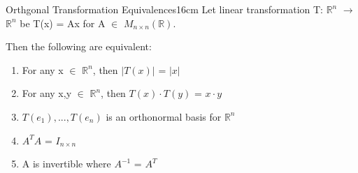     \vspace{0.5cm}

    

    \begin{wtheorem}{Orthgonal Transformation Equivalences}{16cm}
        Let linear transformation T: $\mathbb{R}^n$ $\rightarrow$ $\mathbb{R}^n$
        be T(x) = Ax for A $\in$ $M_{n \times n}(\mathbb{R})$.

        Then the following are equivalent:

        \begin{enumerate}[label=(\alph*), leftmargin=1cm, itemsep=0.1cm]
            \item For any x $\in$ $\mathbb{R}^n$, then
                $|T(x)|$ = $|x|$

            \item For any x,y $\in$ $\mathbb{R}^n$, then
                $T(x) \cdot T(y)$ = $x \cdot y$

            \item $T(e_1),...,T(e_n)$ is an orthonormal basis for $\mathbb{R}^n$
            
            \item $A^TA$ = $I_{n \times n}$
            
            \item A is invertible where $A^{-1}$ = $A^T$
        \end{enumerate}
    \end{wtheorem}


